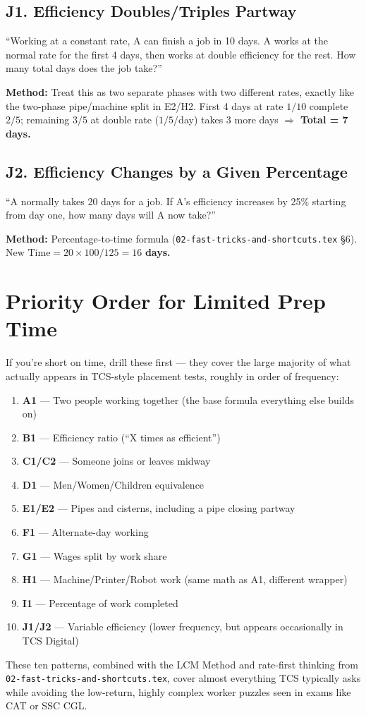 \documentclass[11pt]{article}
\begin{document}
\subsection*{J1. Efficiency Doubles/Triples Partway}
\begin{tipbox}[Phrasing]
``Working at a constant rate, A can finish a job in 10 days. A works at the normal rate for the
first 4 days, then works at double efficiency for the rest. How many total days does the job take?''
\end{tipbox}
\textbf{Method:} Treat this as two separate phases with two different rates, exactly like the
two-phase pipe/machine split in E2/H2. First 4 days at rate $1/10$ complete $2/5$; remaining $3/5$
at double rate ($1/5$/day) takes 3 more days $\Rightarrow$ \textbf{Total = 7 days.}

\subsection*{J2. Efficiency Changes by a Given Percentage}
\begin{tipbox}[Phrasing]
``A normally takes 20 days for a job. If A's efficiency increases by 25\% starting from day one, how
many days will A now take?''
\end{tipbox}
\textbf{Method:} Percentage-to-time formula (\texttt{02-fast-tricks-and-shortcuts.tex} \S6).
$\text{New Time} = 20\times100/125=16$ \textbf{days.}

\section*{Priority Order for Limited Prep Time}
If you're short on time, drill these first --- they cover the large majority of what actually
appears in TCS-style placement tests, roughly in order of frequency:

\begin{formulabox}
\begin{enumerate}[leftmargin=1.4em]
  \item \textbf{A1} --- Two people working together (the base formula everything else builds on)
  \item \textbf{B1} --- Efficiency ratio (``X times as efficient'')
  \item \textbf{C1/C2} --- Someone joins or leaves midway
  \item \textbf{D1} --- Men/Women/Children equivalence
  \item \textbf{E1/E2} --- Pipes and cisterns, including a pipe closing partway
  \item \textbf{F1} --- Alternate-day working
  \item \textbf{G1} --- Wages split by work share
  \item \textbf{H1} --- Machine/Printer/Robot work (same math as A1, different wrapper)
  \item \textbf{I1} --- Percentage of work completed
  \item \textbf{J1/J2} --- Variable efficiency (lower frequency, but appears occasionally in TCS
    Digital)
\end{enumerate}
\end{formulabox}

These ten patterns, combined with the LCM Method and rate-first thinking from
\texttt{02-fast-tricks-and-shortcuts.tex}, cover almost everything TCS typically asks while avoiding
the low-return, highly complex worker puzzles seen in exams like CAT or SSC CGL.
\end{document}
